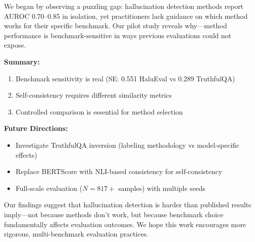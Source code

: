 We began by observing a puzzling gap: hallucination detection methods report AUROC 0.70--0.85 in isolation, yet practitioners lack guidance on which method works for their specific benchmark. Our pilot study reveals why---method performance is benchmark-sensitive in ways previous evaluations could not expose.

\textbf{Summary:}
\begin{enumerate}
    \item Benchmark sensitivity is real (SE: 0.551 HaluEval vs 0.289 TruthfulQA)
    \item Self-consistency requires different similarity metrics
    \item Controlled comparison is essential for method selection
\end{enumerate}

\textbf{Future Directions:}
\begin{itemize}
    \item Investigate TruthfulQA inversion (labeling methodology vs model-specific effects)
    \item Replace BERTScore with NLI-based consistency for self-consistency
    \item Full-scale evaluation ($N=817+$ samples) with multiple seeds
\end{itemize}

Our findings suggest that hallucination detection is harder than published results imply---not because methods don't work, but because benchmark choice fundamentally affects evaluation outcomes. We hope this work encourages more rigorous, multi-benchmark evaluation practices.
